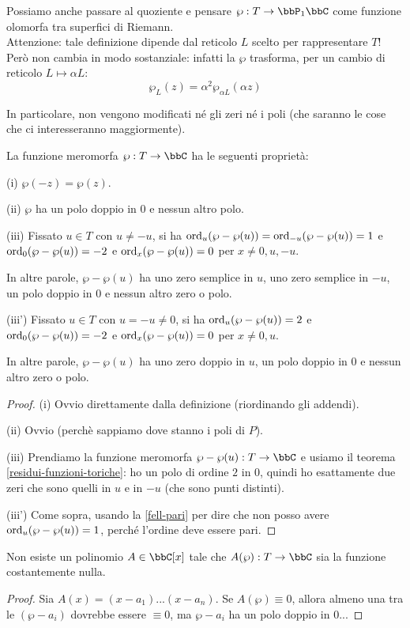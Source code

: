 Possiamo anche passare al quoziente e pensare $\wp:T\rar\bbP_1\bbC$ come funzione olomorfa tra superfici di Riemann.\\
Attenzione: tale definizione dipende dal reticolo $L$ scelto per rappresentare $T$! Però non cambia in modo sostanziale: infatti la $\wp$ trasforma, per un cambio di reticolo $L \mapsto \alpha L$:
\[
 \wp_L(z) = \alpha^2 \wp_{\alpha L}(\alpha z)
\]

In particolare, non vengono modificati né gli zeri né i poli (che saranno le cose che ci interesseranno maggiormente).


\begin{proposizione}
La funzione meromorfa $\wp:T\rar\bbC$ ha le seguenti proprietà:

(i) $\wp(-z)=\wp(z)$.

(ii) $\wp$ ha un polo doppio in $0$ e nessun altro polo.

(iii) Fissato $u\in T$ con $u\not=-u$, si ha $\text{ord}_u(\wp-\wp(u))=\text{ord}_{-u}(\wp-\wp(u))=1$ e $\text{ord}_0(\wp-\wp(u))=-2$ e $\text{ord}_x(\wp-\wp(u))=0$ per $x\not=0,u,-u$.

In altre parole, $\wp-\wp(u)$ ha uno zero semplice in $u$, uno zero semplice in $-u$, un polo doppio in $0$ e nessun altro zero o polo.

(iii') Fissato $u\in T$ con $u=-u\not=0$, si ha $\text{ord}_u(\wp-\wp(u))=2$ e $\text{ord}_0(\wp-\wp(u))=-2$ e $\text{ord}_x(\wp-\wp(u))=0$ per $x\not=0,u$.

In altre parole, $\wp-\wp(u)$ ha uno zero doppio in $u$, un polo doppio in $0$ e nessun altro zero o polo.
\end{proposizione}
\begin{proof}
(i) Ovvio direttamente dalla definizione (riordinando gli addendi).

(ii) Ovvio (perchè sappiamo dove stanno i poli di $P$).

(iii) Prendiamo la funzione meromorfa $\wp-\wp(u):T\rar\bbC$ e usiamo il teorema \ref{residui-funzioni-toriche}: ho un polo di ordine $2$ in $0$, quindi ho esattamente due zeri che sono quelli in $u$ e in $-u$ (che sono punti distinti).

(iii') Come sopra, usando la \ref{fell-pari} per dire che non posso avere $\text{ord}_u(\wp-\wp(u))=1$, perché l'ordine deve essere pari.
\end{proof}


\begin{teorema}
Non esiste un polinomio $A\in\bbC[x]$ tale che $A(\wp):T\rar\bbC$ sia la funzione costantemente nulla.
\end{teorema}
\begin{proof}
Sia $A(x)=(x-a_1)...(x-a_n)$. Se $A(\wp)\equiv0$, allora almeno una tra le $(\wp-a_i)$ dovrebbe essere $\equiv0$, ma $\wp-a_i$ ha un polo doppio in $0$...
\end{proof}


